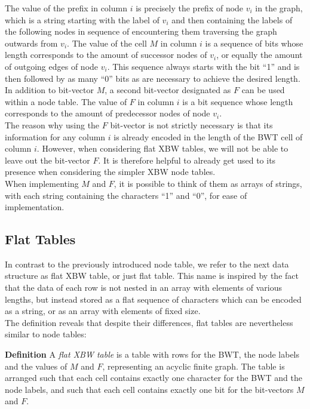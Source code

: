 \documentclass[a4paper,12pt,twoside,BCOR=10mm]{scrbook}
\begin{document}
The value of the prefix in column $ i $ is precisely the prefix of node $ v_i $ in the graph,
which is a string starting with the label of $ v_i $ and then containing
the labels of the following nodes in sequence of encountering them traversing
the graph outwards from $ v_i $.
The value of the cell $ M $ in column $ i $ is a sequence of bits whose length corresponds to
the amount of successor nodes of $ v_i $, or equally the amount of outgoing edges of node $ v_i $.
This sequence always starts with the bit “1” and is then followed
by as many “0” bits as are necessary to achieve the desired length.
In addition to bit-vector $ M $, a second bit-vector designated as $ F $ can be used within a node table.
The value of $ F $ in column $ i $ is a bit sequence whose length corresponds to
the amount of predecessor nodes of node $ v_i $. \\
The reason why using the $ F $ bit-vector is not strictly necessary is that its information
for any column $ i $ is already encoded in the length of the BWT cell of column $ i $. 
However, when considering flat XBW tables, we will not be able to leave out the bit-vector $ F $. 
It is therefore helpful to already get used to its presence when considering the simpler XBW node tables. \\
When implementing $ M $ and $ F $, it is possible to think of them as arrays of strings,
with each string containing the characters “1” and “0”, for ease of implementation.

\subsection{Flat Tables}
\label{sec:flat_table_definition}

In contrast to the previously introduced node table,
we refer to the next data structure as flat XBW table, or just flat table.
This name is inspired by the fact that the data of each row is not
nested in an array with elements of various lengths,
but instead stored as a flat sequence of characters which can be encoded as a string,
or as an array with elements of fixed size. \\
The definition reveals that despite their differences,
flat tables are nevertheless similar to node tables:

\textbf{Definition} A \textit{flat XBW table}\label{def:flat_table} is a table with rows for the BWT,
the node labels and the values of $ M $ and $ F $,
representing an acyclic finite graph.
The table is arranged such that each cell contains exactly one character
for the BWT and the node labels, and such that each cell contains exactly
one bit for the bit-vectors $ M $ and $ F $.
\end{document}
